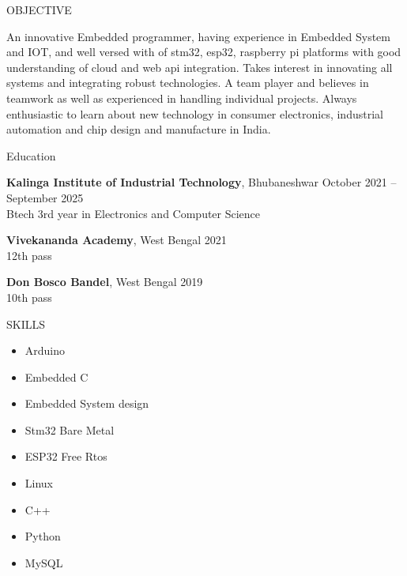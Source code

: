 \documentclass{resume} %
\begin{document}

\begin{rSection}{OBJECTIVE}

{An innovative Embedded programmer, having experience in Embedded System and IOT, and well versed with of  stm32,  esp32,  raspberry pi platforms with good understanding of cloud and web api integration. Takes  interest   in  innovating   all   systems   and   integrating   robust technologies. A  team   player  and  believes  in  teamwork  as  well  as experienced in handling individual projects. Always enthusiastic to learn about new technology in consumer electronics, industrial automation and  chip design and manufacture in India.}



\end{rSection}

\begin{rSection}{Education}

{\bf Kalinga Institute of Industrial Technology}, Bhubaneshwar  \hfill {October 2021 – September 2025}\\
Btech 3rd year in Electronics and Computer Science

{\bf Vivekananda Academy}, West Bengal   \hfill {2021} \\ 12th pass

{\bf Don Bosco Bandel}, West Bengal  \hfill {2019}\\10th pass


\end{rSection}

\begin{rSection}{SKILLS}
    \begin{multicols}{3}
    \begin{itemize}
        \item Arduino                                       
        \item Embedded C
        \item Embedded System design        
        \item Stm32 Bare Metal
        \item ESP32 Free Rtos 
        \item Linux
        \item C++
        \item Python
        \item MySQL
    \end{itemize}
    \end{multicols}
\end{rSection}
\end{document}
